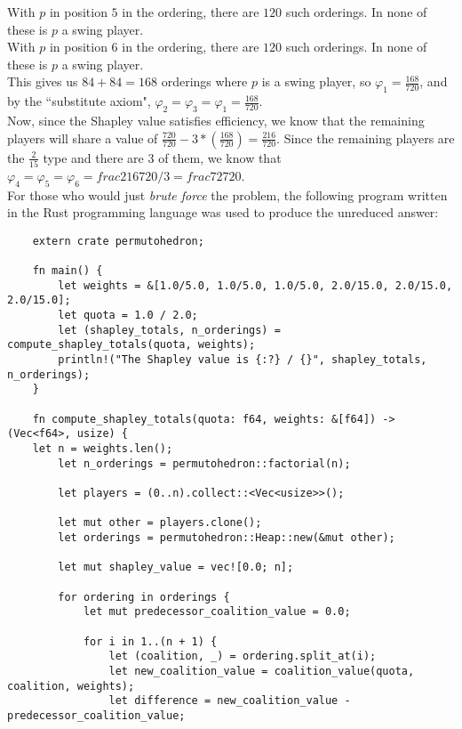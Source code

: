 \documentclass{article}
\begin{document}
\begin{enumerate}
\begin{enumerate}
  With $p$ in position $5$ in the ordering, there are $120$ such orderings. In none of these is $p$ a swing player. \\

  With $p$ in position $6$ in the ordering, there are $120$ such orderings. In none of these is $p$ a swing player. \\

  This gives us $84 + 84 = 168$ orderings where $p$ is a swing player, so $\varphi_{1} = \frac{168}{720}$, and by the ``substitute axiom", $\varphi_{2} = \varphi_{3} = \varphi_{1} = \frac{168}{720}$. \\

  Now, since the Shapley value satisfies efficiency, we know that the remaining players will share a value of $\frac{720}{720} - 3 * (\frac{168}{720}) = \frac{216}{720}$. Since the remaining players are the $\frac{2}{15}$ type and there are $3$ of them, we know that $\varphi_{4} = \varphi_{5} = \varphi_{6} = frac{216}{720} / 3 = frac{72}{720}$. \\

  For those who would just \emph{brute force} the problem, the following program written in the Rust programming language was used to produce the unreduced answer:
  \begin{verbatim}
    extern crate permutohedron;

    fn main() {
        let weights = &[1.0/5.0, 1.0/5.0, 1.0/5.0, 2.0/15.0, 2.0/15.0, 2.0/15.0];
        let quota = 1.0 / 2.0; 
        let (shapley_totals, n_orderings) = compute_shapley_totals(quota, weights);
        println!("The Shapley value is {:?} / {}", shapley_totals, n_orderings);
    }

    fn compute_shapley_totals(quota: f64, weights: &[f64]) -> (Vec<f64>, usize) { 
    let n = weights.len();
        let n_orderings = permutohedron::factorial(n);

        let players = (0..n).collect::<Vec<usize>>();

        let mut other = players.clone();
        let orderings = permutohedron::Heap::new(&mut other);

        let mut shapley_value = vec![0.0; n];

        for ordering in orderings {
            let mut predecessor_coalition_value = 0.0;

            for i in 1..(n + 1) {
                let (coalition, _) = ordering.split_at(i);
                let new_coalition_value = coalition_value(quota, coalition, weights);
                let difference = new_coalition_value - predecessor_coalition_value;


\end{verbatim}
\end{enumerate}
\end{enumerate}
\end{document}
